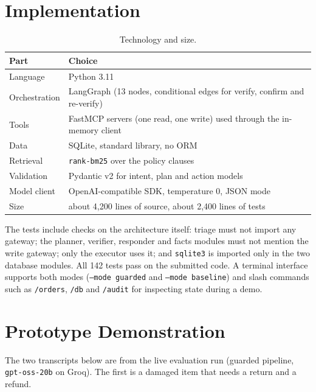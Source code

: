 \documentclass[11pt,a4paper]{article}
\begin{document}
\section{Implementation}
\begin{table}[H]
\centering\small
\begin{tabular}{@{}ll@{}}
\toprule
Part & Choice \\
\midrule
Language & Python 3.11 \\
Orchestration & LangGraph (13 nodes, conditional edges for verify, confirm and re-verify) \\
Tools & FastMCP servers (one read, one write) used through the in-memory client \\
Data & SQLite, standard library, no ORM \\
Retrieval & \texttt{rank-bm25} over the policy clauses \\
Validation & Pydantic v2 for intent, plan and action models \\
Model client & OpenAI-compatible SDK, temperature 0, JSON mode \\
Size & about 4,200 lines of source, about 2,400 lines of tests \\
\bottomrule
\end{tabular}
\caption{Technology and size.}
\end{table}

The tests include checks on the architecture itself: triage must not import any gateway; the planner, verifier, responder and facts modules must not mention the write gateway; only the executor uses it; and \texttt{sqlite3} is imported only in the two database modules. All 142 tests pass on the submitted code. A terminal interface supports both modes (\texttt{--mode guarded} and \texttt{--mode baseline}) and slash commands such as \texttt{/orders}, \texttt{/db} and \texttt{/audit} for inspecting state during a demo.

\section{Prototype Demonstration}
The two transcripts below are from the live evaluation run (guarded pipeline, \texttt{gpt-oss-20b} on Groq). The first is a damaged item that needs a return and a refund.
\end{document}
